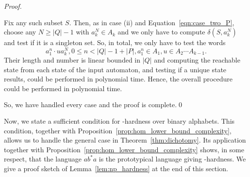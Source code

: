 \begin{proof}
\begin{enumerate}
  Fix any such subset $S$.
  Then, as in case (ii) and Equation~\eqref{eqn:case_two_P}, 
  choose any $N \ge |Q| - 1$ with $a_k^N \in A_k$ and
  we only have to compute $\delta(S, a_k^N)$
  and test if it is a singleton set.
  So, in total, we only have to test the words
  \[
   a_1^n \cdot u a_k^N, 0 \le n < |Q| - 1 + |P|, a_1^n \in A_1, u \in A_2 \cdots A_{k-1}.
  \]
  Their length and number is linear bounded in $|Q|$
  and computing the reachable state from each state of the input automaton,
  and testing if a unique state results, could be performed in polynomial
  time. Hence, the overall procedure could be performed in polynomial time.
 \end{enumerate}
 So, we have handled every case and the proof is complete.\qed
\end{proof}

Now, we state a sufficient condition for \NP-hardness over binary alphabets. 
This condition, together with Proposition~\ref{prop:hom_lower_bound_complexity},
allows us to handle the general case in Theorem~\ref{thm:dichotomy}.
Its application together with Proposition~\ref{prop:hom_lower_bound_complexity} shows, in some respect, that the language $ab^*a$
is the prototypical language giving \NP-hardness.
We give a proof sketch of Lemma~\ref{lem:np_hardness} at the end of this section.

